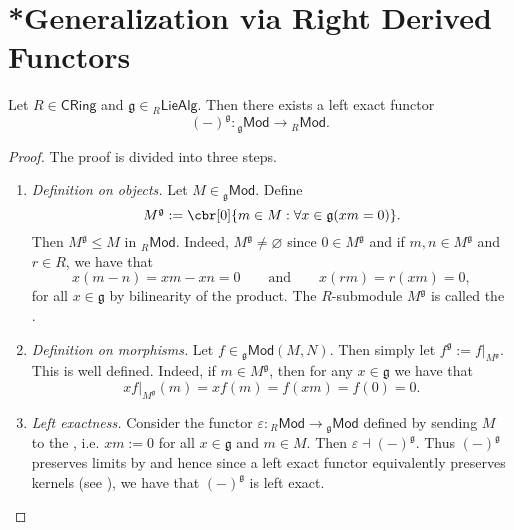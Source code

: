 \section*{*Generalization via Right Derived Functors}
\begin{proposition}
	Let $R \in \mathsf{CRing}$ and $\mathfrak{g} \in {_{R}\mathsf{LieAlg}}$. Then there exists a left exact functor
	\begin{equation*}
		(-)^\mathfrak{g} : {_{\mathfrak{g}}}\mathsf{Mod} \to {_{R}}\mathsf{Mod}.
	\end{equation*}
\end{proposition}

\begin{proof}
	The proof is divided into three steps.
	\begin{enumerate}[label = \textit{Step} \arabic*:, wide = 0pt]
		\item \textit{Definition on objects.} Let $M \in {_{\mathfrak{g}}}\mathsf{Mod}$. Define 
			\begin{equation*}
				M^\mathfrak{g} := \cbr[0]{m \in M : \forall x \in \mathfrak{g}(xm = 0)}.
			\end{equation*}
			Then $M^\mathfrak{g} \leq M$ in $_{R}\mathsf{Mod}$. Indeed, $M^\mathfrak{g} \neq \varnothing$ since $0 \in M^\mathfrak{g}$ and if $m,n \in M^\mathfrak{g}$ and $r \in R$, we have that
			\begin{equation*}
				x(m - n) = xm - xn = 0 \qquad \text{and} \qquad x(rm) = r(xm) = 0,
			\end{equation*}
			\noindent for all $x \in \mathfrak{g}$ by bilinearity of the product. The $R$-submodule $M^\mathfrak{g}$ is called the .
		\item \textit{Definition on morphisms.} Let $f \in {_\mathfrak{g}}\mathsf{Mod}(M,N)$. Then simply let $f^\mathfrak{g} := f\vert_{M^\mathfrak{g}}$. This is well defined. Indeed, if $m \in M^\mathfrak{g}$, then for any $x \in \mathfrak{g}$ we have that
			\begin{equation*}
				xf\vert_{M^\mathfrak{g}}(m) = xf(m) = f(xm) = f(0) = 0.
			\end{equation*}
		\item \textit{Left exactness.} Consider the functor $\varepsilon : {_{R}}\mathsf{Mod} \to {_{\mathfrak{g}}}\mathsf{Mod}$ defined by sending $M$ to the , i.e. $xm := 0$ for all $x \in \mathfrak{g}$ and $m \in M$. Then $\varepsilon \dashv (-)^\mathfrak{g}$. Thus $(-)^\mathfrak{g}$ preserves limits by \cite[159]{leinster:basic_category:2016} and hence since a left exact functor equivalently preserves kernels (see \cite[65]{freyd:abelian_categories:1964}), we have that $(-)^\mathfrak{g}$ is left exact.
	\end{enumerate}
\end{proof}


